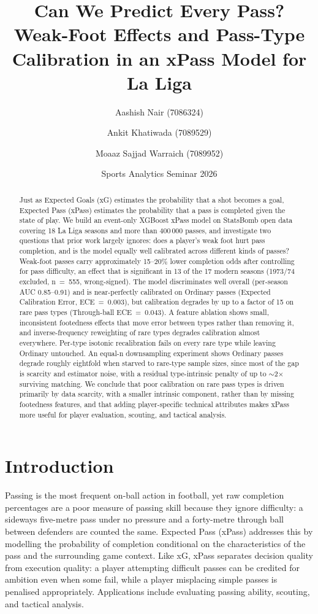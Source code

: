 \documentclass[11pt,a4paper]{article}
\title{Can We Predict Every Pass?\\Weak-Foot Effects and Pass-Type Calibration in an xPass Model for La Liga}
\author{Aashish Nair (7086324) \and Ankit Khatiwada (7089529) \and Moaaz Sajjad Warraich (7089952)}
\date{Sports Analytics Seminar 2026}
\begin{document}
\maketitle

\begin{abstract}
Just as Expected Goals (xG) estimates the probability that a shot becomes a
goal, Expected Pass (xPass) estimates the probability that a pass is
completed given the state of play. We build an event-only XGBoost xPass
model on StatsBomb open data covering 18 La Liga seasons and more than
400\,000 passes, and investigate two questions that prior work largely
ignores: does a player's weak foot hurt pass completion, and is the model
equally well calibrated across different kinds of passes? Weak-foot passes
carry approximately 15--20\% lower completion odds after controlling for
pass difficulty, an effect that is significant in 13 of the 17 modern seasons (1973/74 excluded, n~=~555, wrong-signed). The
model discriminates well overall (per-season AUC 0.85--0.91) and is
near-perfectly calibrated on Ordinary passes (Expected Calibration Error,
ECE~=~0.003), but calibration degrades by up to a factor of 15 on rare
pass types (Through-ball ECE~=~0.043). A feature ablation shows small,
inconsistent footedness effects that move error between types rather than
removing it, and inverse-frequency reweighting of
rare types degrades calibration almost everywhere. Per-type isotonic recalibration fails on every rare type while leaving Ordinary untouched. An equal-n downsampling experiment shows Ordinary passes degrade roughly eightfold when starved to rare-type sample sizes, since most of the gap is scarcity and estimator noise, with a residual type-intrinsic penalty of up to $\sim$2$\times$ surviving matching. We conclude
that poor calibration on rare pass types is driven primarily by data
scarcity, with a smaller intrinsic component, rather than by missing footedness features, and that adding
player-specific technical attributes makes xPass more useful for player
evaluation, scouting, and tactical analysis.
\end{abstract}

\section{Introduction}
Passing is the most frequent on-ball action in football, yet raw completion
percentages are a poor measure of passing skill because they ignore
difficulty: a sideways five-metre pass under no pressure and a forty-metre
through ball between defenders are counted the same. Expected Pass (xPass)
addresses this by modelling the probability of completion conditional on
the characteristics of the pass and the surrounding game context. Like xG,
xPass separates decision quality from execution quality: a player
attempting difficult passes can be credited for ambition even when some
fail, while a player misplacing simple passes is penalised appropriately.
Applications include evaluating passing ability, scouting, and tactical
analysis.
\end{document}

